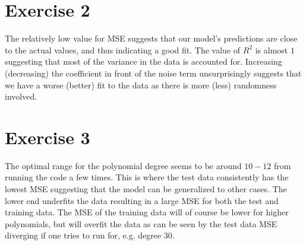 \documentclass{article}
\begin{document}
	\section*{Exercise 2}
	The relatively low value for MSE suggests that our model's predictions are close to the actual values, and thus indicating a good fit. The value of $R^2$ is almost $1$ suggesting that most of the variance in the data is accounted for. Increasing (decreasing) the coefficient in front of the noise term unsurprisingly suggests that we have a worse (better) fit to the data as there is more (less) randomness involved.
	
	\section*{Exercise 3}
	The optimal range for the polynomial degree seems to be around $10-12$ from running the code a few times. This is where the test data consistently has the lowest MSE suggesting that the model can be generalized to other cases. The lower end underfits the data resulting in a large MSE for both the test and training data. The MSE of the training data will of course be lower for higher polynomials, but will overfit the data as can be seen by the test data MSE diverging if one tries to run for, e.g. degree 30.
	
\end{document}
